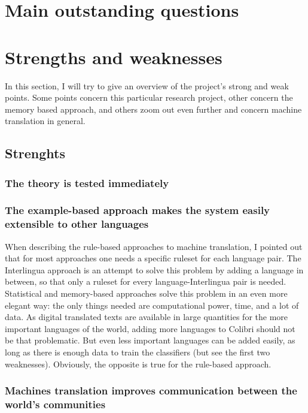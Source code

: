 \documentclass[12pt]{article}
\begin{document}
\section{Main outstanding questions}






\section{Strengths and weaknesses}

In this section, I will try to give an overview of the project's strong and weak points. Some points concern this particular research project, other concern the memory based approach, and others zoom out even further and concern machine translation in general.

\subsection{Strenghts}

\subsubsection{The theory is tested immediately}

\subsubsection{The example-based approach makes the system easily extensible to other languages}

When describing the rule-based approaches to machine translation, I pointed out that for most approaches one needs a specific ruleset for each language pair. The Interlingua approach is an attempt to solve this problem by adding a language in between, so that only a ruleset for every language-Interlingua pair is needed. Statistical and memory-based approaches solve this problem in an even more elegant way: the only things needed are computational power, time, and a lot of data. As digital translated texts are available in large quantities for the more important languages of the world, adding more languages to Colibri should not be that problematic. But even less important languages can be added easily, as long as there is enough data to train the classifiers (but see the first two weaknesses). Obviously, the opposite is true for the rule-based approach.

\subsubsection{Machines translation improves communication between the world's communities}
\end{document}

